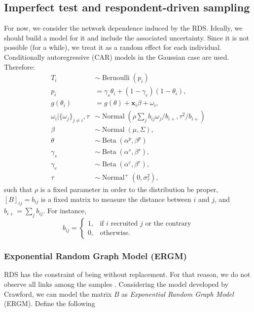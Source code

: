 \documentclass[a4paper, notitlepage, 11pt]{article}
\newcommand{\x}{\boldsymbol{x}}
\newcommand{\N}{\operatorname{Normal}}
\newcommand{\betadist}{\operatorname{Beta}}
\theoremstyle{definition}
\theoremstyle{remark}
\begin{document}
\subsection{Imperfect test and respondent-driven sampling}

For now, we consider the network dependence induced by the RDS. Ideally, we 
should build a model for it and include the associated uncertainty.
Since it is not possible (for a while), we treat it as a random effect for
each individual. Conditionally autoregressive (CAR) models in the
Gaussian case are used. Therefore: 
\begin{equation}
  \begin{aligned}
    T_i &\sim \operatorname{Bernoulli}(p_i) \\
    p_i &= \gamma_s\theta_i + (1-\gamma_e)(1 - \theta_i),  \\
    g(\theta_i) &= g(\theta) + \x_i\beta + \omega_i,  \\
    \omega_i|\{\omega_j\}_{j\neq i}, \tau &\sim \N\left(\rho\sum_j b_{ij}\omega_j/b_{i+}, \tau^2/b_{i+}\right) \\
    \beta &\sim \N(\mu, \Sigma), \\ 
    \theta &\sim \betadist(\alpha^p, \beta^p) \\
    \gamma_s &\sim \betadist(\alpha^s, \beta^s), \\
    \gamma_e &\sim \betadist(\alpha^e, \beta^e), \\  
    \tau &\sim \N^+(0,\sigma^2_{\tau}),  
  \end{aligned}  
\end{equation}
such that $\rho$ is a fixed parameter in order to the distribution be proper, $[B]_{ij} = b_{ij}$ is a fixed matrix to measure the distance between $i$
and $j$, and $b_{i+} = \sum_{j} b_{ij}$. For instance, 
$$
b_{ij} = \begin{cases}
  1, &\text{if } i \text{ recruited } j \text{ or the contrary} \\
  0, &\text{otherwise.} 
\end{cases}
$$

\subsubsection{Exponential Random Graph Model (ERGM)}

RDS has the constraint of being without replacement. For that reason, we do
not observe all links among the samples \cite{crawford2016}. Considering the
model developed by Crawford, we can model the
matrix $B$ as {\em Exponential Random Graph Model} (ERGM). Define the
following 
\end{document}
